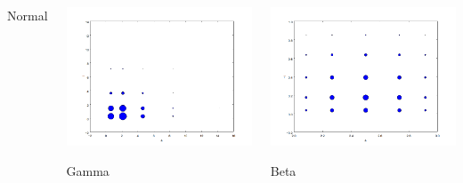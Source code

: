 \documentclass{beamer}
\begin{document}
\begin{frame}
\begin{columns}
\begin{center}
                Normal
     \end{center}
     \begin{center}
                \includegraphics[width=.7\textwidth]{nodes_gamma.png}

                Gamma
     \end{center}

     \begin{center}
                \includegraphics[width=.7\textwidth]{nodes_beta.png}

                Beta
     \end{center}
 \end{columns}
\end{frame}
 
 
% 
\end{document}
